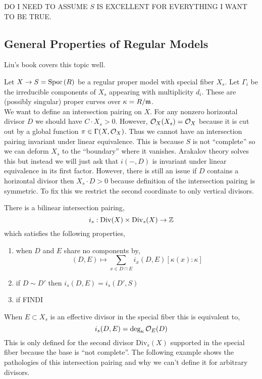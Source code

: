 \documentclass[12pt]{article}
\begin{document}
\begin{rmk}
DO I NEED TO ASSUME $S$ IS EXCELLENT FOR EVERYTHING I WANT TO BE TRUE.
\end{rmk}

\subsection{General Properties of Regular Models}

\begin{rmk}
Liu's book covers this topic well. 
\end{rmk}
\renewcommand{\Div}{\mathrm{Div}}

Let $X \to S = \mathrm{Spec}\left( R \right)$ be a regular proper model with special fiber $X_s$. Let $\Gamma_i$ be the irreducible components of $X_s$ appearing with multiplicity $d_i$. These are (possibly singular) proper curves over $\kappa = R / \mathfrak{m}$. 
\bigskip\\
We want to define an intersection pairing on $X$.  For any nonzero horizontal divisor $D$ we should have $C \cdot X_s > 0$. However, $\mathcal{O}_{X}(X_s) = \mathcal{O}_{X}$ because it is cut out by a global function $\pi \in \Gamma(X, \mathcal{O}_{X})$. Thus we cannot have an intersection pairing invariant under linear equivalence. This is because $S$ is not ``complete'' so we can deform $X_s$ to the ``boundary'' where it vanishes. Arakalov theory solves this but instead we will just ask that $i(-,D)$ is invariant under linear equivalence in its first factor. However, there is still an issue if $D$ contains a horizontal divisor then $X_s \cdot D > 0$ because definition of the intersection pairing is symmetric. To fix this we restrict the second coordinate to only vertical divisors.

\begin{lemma}
There is a bilinear intersection pairing,
\[ i_s :  \Div(X) \times \Div_s(X) \to \Z \]
which satisfies the following properties,
\begin{enumerate}
\item when $D$ and $E$ share no components by,
\[ (D, E) \mapsto \sum_{x \in D \cap E} i_x(D, E) [\kappa(x) : \kappa] \]

\item if $D \sim D'$ then $i_s(D, E) = i_s(D', S)$

\item if FINDI
\end{enumerate}
When $E \subset X_s$ is an effective divisor in the special fiber this is equivalent to,
\[ i_s(D, E) = \deg_{\kappa} \mathcal{O}_{E}(D) \]
This is only defined for the second divisor $\Div_s(X)$ supported in the special fiber because the base is ``not complete''.  The following example shows the pathologies of this intersection pairing and why we can't define it for arbitrary divisors. 
\end{lemma}
\end{document}
